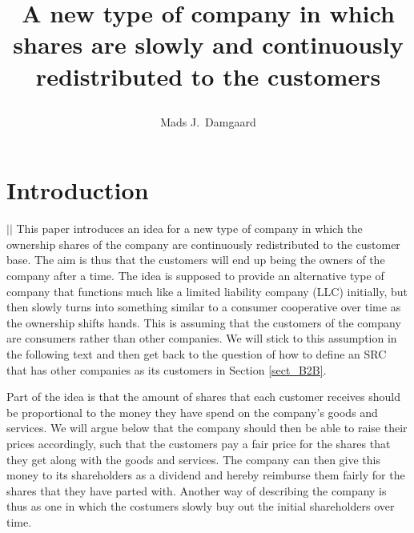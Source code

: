 \documentclass{article}
\title{
	A new type of company in which shares are slowly and continuously redistributed to the customers
	\author{Mads J.\ Damgaard%
	}
}
\begin{document}
\maketitle

\section{Introduction}
{\centering\noindent
	\vspace{-\baselineskip}
	\hspace{-0.7em}
	{\hspace{-4.em}$|$\hspace{\linewidth}\hspace{8em}$|$}
}
This paper introduces an idea for a new type of company in which the ownership shares of the company are continuously redistributed to the customer base. The aim is thus that the customers will end up being the owners of the company after a time. The idea is supposed to provide an alternative type of company that functions much like a limited liability company (LLC) initially, but then slowly turns into something similar to a consumer cooperative over time as the ownership shifts hands. 
%
This is assuming that the customers of the company are consumers rather than other companies. We will stick to this assumption in the following text and then get back to the question of how to define an SRC that has other companies as its customers in Section \ref{sect_B2B}. 

Part of the idea is that the amount of shares that each customer receives should be proportional to the money they have spend on the company's goods and services. We will argue below that the company should then be able to raise their prices accordingly, such that the customers pay a fair price for the shares that they get along with the goods and services. The company can then give this money to its shareholders as a dividend and hereby reimburse them fairly for the shares that they have parted with. 
%
Another way of describing the company is thus as one in which the costumers slowly buy out the initial shareholders over time.
\end{document}
